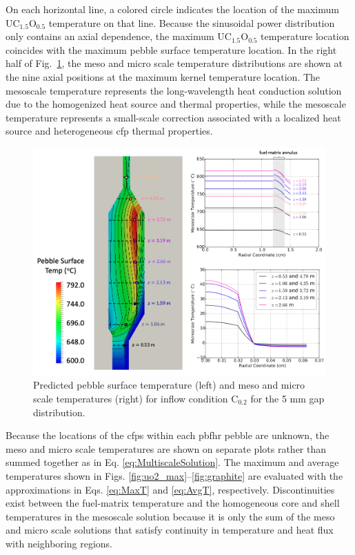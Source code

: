 On each horizontal line, a colored circle indicates the location of the maximum UC$_{1.5}$O$_{0.5}$ temperature on that line. Because the sinusoidal power distribution only contains an axial dependence, the maximum UC$_{1.5}$O$_{0.5}$ temperature location coincides with the maximum pebble surface temperature location. In the right half of Fig.\ \ref{fig:multiscale_fuel}, the meso and micro scale temperature distributions are shown at the nine axial positions at the maximum kernel temperature location. The mesoscale temperature represents the long-wavelength heat conduction solution due to the homogenized heat source and thermal properties, while the mesoscale temperature represents a small-scale correction associated with a localized heat source and heterogeneous \gls{cfp} thermal properties. 

\begin{figure}[h!]
\centering
\includegraphics[width=0.9\linewidth]{figs/multiscale_fuel.png}
\caption{Predicted pebble surface temperature (left) and meso and micro scale temperatures (right) for inflow condition C$_\text{0.2}$ for the 5 \si{\milli\meter} gap distribution. }
\label{fig:multiscale_fuel}
\end{figure}

Because the locations of the \glspl{cfp} within each \gls{pbfhr} pebble are unknown, the meso and micro scale temperatures are shown on separate plots rather than summed together as in Eq. \eqref{eq:MultiscaleSolution}. The maximum and average temperatures shown in Figs. \ref{fig:uo2_max}--\ref{fig:graphite} are evaluated with the approximations in Eqs. \eqref{eq:MaxT} and \eqref{eq:AvgT}, respectively. Discontinuities exist between the fuel-matrix temperature and the homogeneous core and shell temperatures in the mesoscale solution because it is only the sum of the meso and micro scale solutions that satisfy continuity in temperature and heat flux with neighboring regions.

